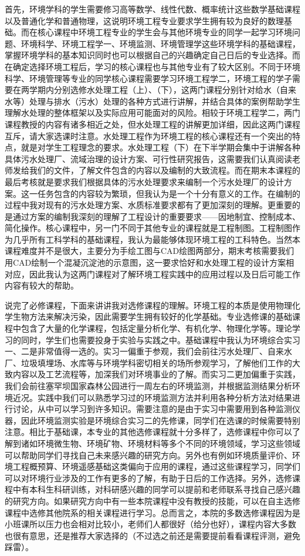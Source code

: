 \documentclass[11pt,oneside]{book}
\begin{document}
首先，环境学科的学生需要修习高等数学、线性代数、概率统计这些数学基础课程以及普通化学和普通物理，这说明环境工程专业要求学生拥有较为良好的数理基础。而在核心课程中环境工程专业的学生会与其他环境专业的同学一起学习环境问题、环境科学、环境工程学一、环境监测、环境管理学这些环境学科的基础课程，掌握环境学科的基本知识同时也可以根据自己的兴趣确定自己日后的专业选择。而在确定选择环境工程后，学习的核心课程也与其他专业有了较大区别。不同于环境科学、环境管理等专业的同学核心课程需要学习环境工程学二，环境工程的学子需要在两学期内分别选修水处理工程（上）、（下），这两门课程分别针对给水（自来水等）处理与排水（污水）处理的各种方式进行讲解，并结合具体的案例帮助学生理解水处理的整体框架以及实际应用可能面对的风险。相较于环境工程学二，两门课程教授的内容有诸多相近之处，但水处理工程的讲解更加详细，因此这两门课程互斥，请大家选课时注意。水处理工程作为环境工程的核心课程还有一个突出的特点，就是对学生工程理念的要求。水处理工程（下）在下半学期会集中于讲解各种具体污水处理厂、流域治理的设计方案、可行性研究报告，这需要我们认真阅读老师发给我们的文件，了解文件包含的内容以及编制的大致流程。而在期末本课程的最后考核就是要求我们根据具体的污水处理要求来编制一个污水处理厂的设计方案。这一任务包含的内容较为繁琐，但我认为是一个十分有意义的工作。在编制的过程中我对现有的污水处理方案、水质标准要求都有了更加深刻的理解。更重要的是通过方案的编制我深刻的理解了工程设计的重要要求——因地制宜、控制成本、简化操作。核心课程中，另一门不同于其他专业的课程就是工程制图。工程制图作为几乎所有工科学科的基础课程，我认为最能够体现环境工程的工科特色。当然本课程难度并不是很大，主要分为手绘工图与CAD绘图两部分，期末考核需要我们用CAD绘制一个混凝沉淀池的示意图，这一要求恰好和水处理工程的设计方案相对应，因此我认为这两门课程对了解环境工程实践中的应用过程以及日后可能工作内容有较大的帮助。

说完了必修课程，下面来讲讲我对选修课程的理解。环境工程的本质是使用物理化学生物方法来解决污染，因此需要学生拥有较好的化学基础。专业选修课的基础课程中包含了大量的化学课程，包括定量分析化学、有机化学、物理化学等。理论学习的同时，学生们也需要投身于实验与实践之中。基础课程中我认为环境综合实习一、二是非常值得一选的。实习一偏重于参观，我们会前往污水处理厂、自来水厂、垃圾填埋场、水库等与环境学科密切相关的场所参观学习，了解他们工作的大致内容以及工艺流程等，加深我们对环境事业的了解。而实习二更加偏重于实践，我们会前往塞罕坝国家森林公园进行一周左右的环境监测，并根据监测结果分析环境近况。实践中我们可以熟悉学习过的环境监测方法并利用各种分析方法对结果进行讨论，从中可以学习到许多知识。需要注意的是由于实习中需要用到各种监测仪器，因此环境监测实验是环境综合实习二的先修课，同学们在选课的时候需要特别注意。相比于基础课，本专业的其他选修课程就十分多样了，选修课程中你可以了解到诸如环境微生物、环境矿物、环境材料等多个不同的环境领域，学习这些领域可以帮助同学们寻找自己未来感兴趣的研究方向。另外也有例如环境质量评价、环境工程概预算、环境遥感基础这类偏向于应用的课程，通过这些课程学习，同学们可以对环境行业涉及的工作有更多的了解，有助于日后的工作选择。另外，选修课程中有本科生科研训练，对科研感兴趣的同学可以提前和老师联系寻找自己感兴趣的研究方向。如果研究方向中有一些本院课程中没有教授的技能，可以在自主选修课程中选修其他院系的相关课程进行学习。总而言之，本院的多数选修课程因为是小班课所以压力也会相对比较小，老师们人都很好（给分也好），课程内容大多数也很有意思，还是推荐大家选择的（不过选之前还是需要提前看看课程评测，避免踩雷）。
\end{document}
